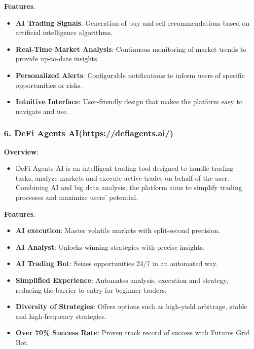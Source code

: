 \documentclass[
]{article}
\providecommand{\tightlist}{%
  \setlength{\itemsep}{0pt}\setlength{\parskip}{0pt}}
\begin{document}
\textbf{Features}:

\begin{itemize}
\tightlist
\item
  \textbf{AI Trading Signals}: Generation of buy and sell
  recommendations based on artificial intelligence algorithms.
\item
  \textbf{Real-Time Market Analysis}: Continuous monitoring of market
  trends to provide up-to-date insights.
\item
  \textbf{Personalized Alerts}: Configurable notifications to inform
  users of specific opportunities or risks.
\item
  \textbf{Intuitive Interface}: User-friendly design that makes the
  platform easy to navigate and use.
\end{itemize}

\hypertarget{defi-agents-aihttpsdefiagents.ai}{%
\subsubsection{\texorpdfstring{\textbf{6. DeFi Agents
AI}\href{https://defiagents.ai/}{(https://defiagents.ai/)}}{6. DeFi Agents AI(https://defiagents.ai/)}}\label{defi-agents-aihttpsdefiagents.ai}}

\textbf{Overview}:

\begin{itemize}
\tightlist
\item
  DeFi Agents AI is an intelligent trading tool designed to handle
  trading tasks, analyze markets and execute active trades on behalf of
  the user. Combining AI and big data analysis, the platform aims to
  simplify trading processes and maximize users' potential.
\end{itemize}

\textbf{Features}:

\begin{itemize}
\tightlist
\item
  \textbf{AI execution}: Master volatile markets with split-second
  precision.
\item
  \textbf{AI Analyst}: Unlocks winning strategies with precise insights.
\item
  \textbf{AI Trading Bot}: Seizes opportunities 24/7 in an automated
  way.
\item
  \textbf{Simplified Experience}: Automates analysis, execution and
  strategy, reducing the barrier to entry for beginner traders.
\item
  \textbf{Diversity of Strategies}: Offers options such as high-yield
  arbitrage, stable and high-frequency strategies.
\item
  \textbf{Over 70\% Success Rate}: Proven track record of success with
  Futures Grid Bot.
\end{itemize}
\end{document}
